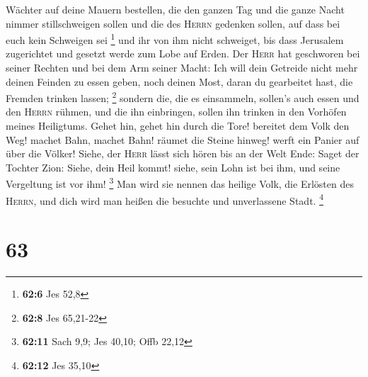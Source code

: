 Wächter auf deine Mauern bestellen, die den ganzen Tag und die ganze
Nacht nimmer stillschweigen sollen und die des \textsc{Herrn} gedenken
sollen, auf dass bei euch kein Schweigen sei \footnote{\textbf{62:6} Jes
  52,8}  und ihr von ihm nicht schweiget, bis dass
Jerusalem zugerichtet und gesetzt werde zum Lobe auf Erden.
 Der \textsc{Herr} hat geschworen bei seiner Rechten und
bei dem Arm seiner Macht: Ich will dein Getreide nicht mehr deinen
Feinden zu essen geben, noch deinen Most, daran du gearbeitet hast, die
Fremden trinken lassen; \footnote{\textbf{62:8} Jes 65,21-22}
 sondern die, die es einsammeln, sollen's auch essen und
den \textsc{Herrn} rühmen, und die ihn einbringen, sollen ihn trinken in
den Vorhöfen meines Heiligtums.  Gehet hin, gehet hin
durch die Tore! bereitet dem Volk den Weg! machet Bahn, machet Bahn!
räumet die Steine hinweg! werft ein Panier auf über die Völker!
 Siehe, der \textsc{Herr} lässt sich hören bis an der
Welt Ende: Saget der Tochter Zion: Siehe, dein Heil kommt! siehe, sein
Lohn ist bei ihm, und seine Vergeltung ist vor ihm! \footnote{\textbf{62:11}
  Sach 9,9; Jes 40,10; Offb 22,12}  Man wird sie nennen
das heilige Volk, die Erlösten des \textsc{Herrn}, und dich wird man
heißen die besuchte und unverlassene Stadt. \footnote{\textbf{62:12} Jes
  35,10}

\hypertarget{section-24}{%
\section{63}\label{section-24}}

